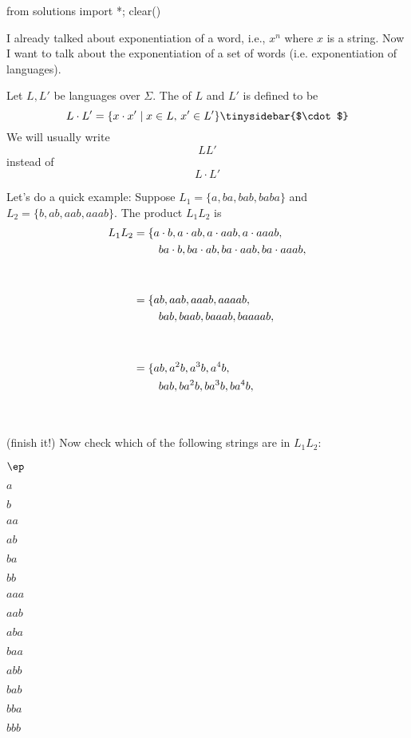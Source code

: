 \begin{python0}
from solutions import *; clear()
\end{python0}

I already talked about exponentiation of a word, 
i.e., $x^n$ where $x$ is a string.
Now I want to talk about the exponentiation of a set of words (i.e.
exponentiation of languages).

\begin{defn}
Let $L, L'$ be languages over $\Sigma$.
The
of $L$ and $L'$ is defined to be
\[
L \cdot L' = \{x \cdot x' \mid x \in L, \, x' \in L'\}
\index{$\cdot$}\tinysidebar{$\cdot$}
\]
We will usually write
\[
LL'
\]
instead of 
\[
L \cdot L'
\]
\end{defn}

Let's do a quick example:
Suppose $L_1 = \{a, ba, bab, baba\}$ 
and $L_2 = \{b, ab, aab, aaab\}$.
The product $L_1 L_2$ is
\begin{align*}
L_1L_2 
&=   \{a\cdot b, a\cdot ab, a \cdot aab, a \cdot aaab, \\
& \hspace{0.8cm} ba \cdot b, ba \cdot ab, ba \cdot aab, ba \cdot aaab, \\ 
& \\
& \\
&=   \{ab, aab, aaab, aaaab, \\
& \hspace{0.8cm} bab, baab, baaab, baaaab, \\ 
& \\
& \\
&=   \{ab, a^2b, a^3b, a^4b, \\
& \hspace{0.8cm} bab, ba^2b, ba^3b, ba^4b, \\ 
& \\
& \\
\end{align*}
(finish it!)
Now check which of the following strings are in $L_1L_2$:
\begin{tightlist}
\item $\ep$
\item $a$
\item $b$
\item $aa$
\item $ab$
\item $ba$
\item $bb$
\item $aaa$
\item $aab$
\item $aba$
\item $baa$
\item $abb$
\item $bab$
\item $bba$
\item $bbb$
\end{tightlist}



